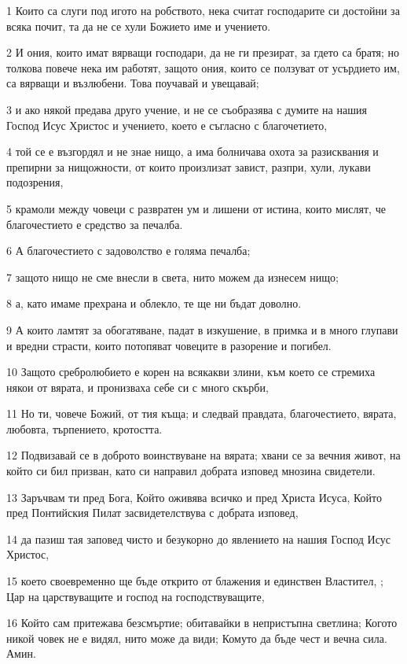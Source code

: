 \par 1 Които са слуги под игото на робството, нека считат господарите си достойни за всяка почит, та да не се хули Божието име и учението.
\par 2 И ония, които имат вярващи господари, да не ги презират, за гдето са братя; но толкова повече нека им работят, защото ония, които се ползуват от усърдието им, са вярващи и възлюбени. Това поучавай и увещавай;
\par 3 и ако някой предава друго учение, и не се съобразява с думите на нашия Господ Исус Христос и учението, което е съгласно с благочетието,
\par 4 той се е възгордял и не знае нищо, а има болничава охота за разисквания и препирни за нищожности, от които произлизат завист, разпри, хули, лукави подозрения,
\par 5 крамоли между човеци с развратен ум и лишени от истина, които мислят, че благочестието е средство за печалба.
\par 6 А благочестието с задоволство е голяма печалба;
\par 7 защото нищо не сме внесли в света, нито можем да изнесем нищо;
\par 8 а, като имаме прехрана и облекло, те ще ни бъдат доволно.
\par 9 А които ламтят за обогатяване, падат в изкушение, в примка и в много глупави и вредни страсти, които потопяват човеците в разорение и погибел.
\par 10 Защото сребролюбието е корен на всякакви злини, към което се стремиха някои от вярата, и пронизваха себе си с много скърби,
\par 11 Но ти, човече Божий, от тия къща; и следвай правдата, благочестието, вярата, любовта, търпението, кротостта.
\par 12 Подвизавай се в доброто воинствуване на вярата; хвани се за вечния живот, на който си бил призван, като си направил добрата изповед мнозина свидетели.
\par 13 Заръчвам ти пред Бога, Който оживява всичко и пред Христа Исуса, Който пред Понтийския Пилат засвидетелствува с добрата изповед,
\par 14 да пазиш тая заповед чисто и безукорно до явлението на нашия Господ Исус Христос,
\par 15 което своевременно ще бъде открито от блажения и единствен Властител, ; Цар на царствуващите и господ на господствуващите,
\par 16 Който сам притежава безсмъртие; обитавайки в непристъпна светлина; Когото никой човек не е видял, нито може да види; Комуто да бъде чест и вечна сила. Амин.
